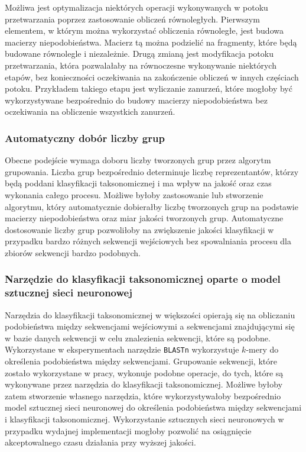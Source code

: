             Możliwa jest optymalizacja niektórych operacji wykonywanych w potoku przetwarzania poprzez zastosowanie obliczeń równoległych. Pierwszym elementem, w którym można wykorzystać obliczenia równoległe, jest budowa macierzy niepodobieństwa. Macierz tą można podzielić na fragmenty, które będą budowane równolegle i niezależnie. Drugą zmianą jest modyfikacja potoku przetwarzania, która pozwalałaby na równoczesne wykonywanie niektórych etapów, bez konieczności oczekiwania na zakończenie obliczeń w innych częściach potoku. Przykładem takiego etapu jest wyliczanie zanurzeń, które mogłoby być wykorzystywane bezpośrednio do budowy macierzy niepodobieństwa bez oczekiwania na obliczenie wszystkich zanurzeń.

        \subsubsection{Automatyczny dobór liczby grup}

            Obecne podejście wymaga doboru liczby tworzonych grup przez algorytm grupowania. Liczba grup bezpośrednio determinuje liczbę reprezentantów, którzy będą poddani klasyfikacji taksonomicznej i ma wpływ na jakość oraz czas wykonania całego procesu. Możliwe byłoby zastosowanie lub stworzenie algorytmu, który automatycznie dobierałby liczbę tworzonych grup na podstawie macierzy niepodobieństwa oraz miar jakości tworzonych grup. Automatyczne dostosowanie liczby grup pozwoliłoby na zwiększenie jakości klasyfikacji w przypadku bardzo różnych sekwencji wejściowych bez spowalniania procesu dla zbiorów sekwencji bardzo podobnych.

        \subsubsection{Narzędzie do klasyfikacji taksonomicznej oparte o model sztucznej sieci neuronowej}

            Narzędzia do klasyfikacji taksonomicznej w większości opierają się na obliczaniu podobieństwa między sekwencjami wejściowymi a sekwencjami znajdującymi się w bazie danych sekwencji w celu znalezienia sekwencji, które są podobne. Wykorzystane w eksperymentach narzędzie \texttt{BLASTn} wykorzystuje $k$-mery do określenia podobieństwa między sekwencjami. 
            Grupowanie sekwencji, które zostało wykorzystane w pracy, wykonuje podobne operacje, do tych, które są wykonywane przez narzędzia do klasyfikacji taksonomicznej. Możliwe byłoby zatem stworzenie własnego narzędzia, które wykorzystywałoby bezpośrednio model sztucznej sieci neuronowej do określenia podobieństwa między sekwencjami i klasyfikacji taksonomicznej. Wykorzystanie sztucznych sieci neuronowych w przypadku wydajnej implementacji mogłoby pozwolić na osiągnięcie akceptowalnego czasu działania przy wyższej jakości.

